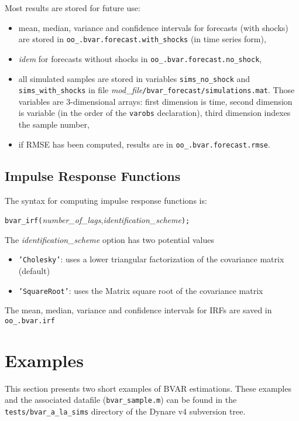 \documentclass[11pt,a4paper]{article}
\begin{document}
Most results are stored for future use:
\begin{itemize}
\item mean, median, variance and confidence intervals for forecasts (with shocks) are stored in \texttt{oo\_.bvar.forecast.with\_shocks} (in time series form),
\item \textit{idem} for forecasts without shocks in \texttt{oo\_.bvar.forecast.no\_shock},
\item all simulated samples are stored in variables \texttt{sims\_no\_shock} and \texttt{sims\_with\_shocks} in file \textit{mod\_file}\texttt{/bvar\_forecast/simulations.mat}. Those variables are 3-dimensional arrays: first dimension is time, second dimension is variable (in the order of the \texttt{varobs} declaration), third dimension indexes the sample number,
\item if RMSE has been computed, results are in \texttt{oo\_.bvar.forecast.rmse}.
\end{itemize}

\subsection{Impulse Response Functions}

The syntax for computing impulse response functions is:

\medskip
\texttt{bvar\_irf(}\textit{number\_of\_lags},\textit{identification\_scheme}\texttt{);}
\medskip

The \textit{identification\_scheme} option has two potential values
\begin{itemize}
\item \texttt{'Cholesky'}: uses a lower triangular factorization of the covariance matrix (default)
\item \texttt{'SquareRoot'}: uses the Matrix square root of the covariance matrix
\end{itemize}

The mean, median, variance and confidence intervals for IRFs are saved in \texttt{oo\_.bvar.irf}

\section{Examples}

This section presents two short examples of BVAR estimations. These examples and the associated datafile (\texttt{bvar\_sample.m}) can be found in the \texttt{tests/bvar\_a\_la\_sims} directory of the Dynare v4 subversion tree.
\end{document}

